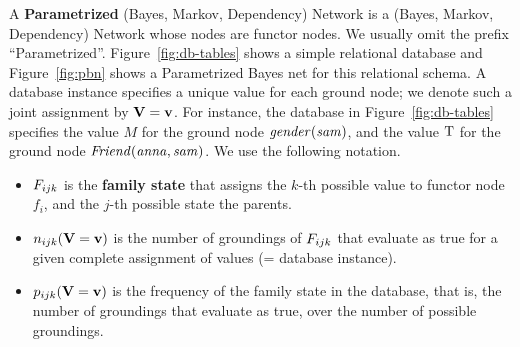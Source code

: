 \documentclass[twoside,leqno,twocolumn]{article}
\begin{document}


A \textbf{Parametrized} (Bayes, Markov, Dependency) Network is a (Bayes, Markov, Dependency) Network whose
nodes are functor nodes.  We usually omit the prefix ``Parametrized''. Figure~\ref{fig:db-tables} shows a simple relational database and Figure~\ref{fig:pbn} shows a Parametrized Bayes net for this relational schema. 
A database instance specifies a unique value for each ground node; we denote such a joint assignment by $\mathbf{V} = \mathbf{v}$. For instance, the database in Figure~\ref{fig:db-tables} specifies the value $M$ for the ground node $\it{gender}(sam)$, and the value $\mathrm{T}$ for the ground node $\it{Friend}(anna,sam)$. We use the following notation. 
\begin{itemize}
\item$F_{ijk}$ is the \textbf{family state} that assigns the $k$-th possible value to functor node $f_{i}$, and the $j$-th possible state the parents.
\item $n_{ijk}(\mathbf{V} = \mathbf{v})$ is the number of groundings of $F_{ijk}$ that evaluate as true for a given complete assignment of values (= database instance).
\item $p_{ijk}(\mathbf{V} = \mathbf{v})$ is the frequency of the family state in the database, that is, the number of groundings that evaluate as true, over the number of possible groundings.
\end{itemize}
\end{document}
